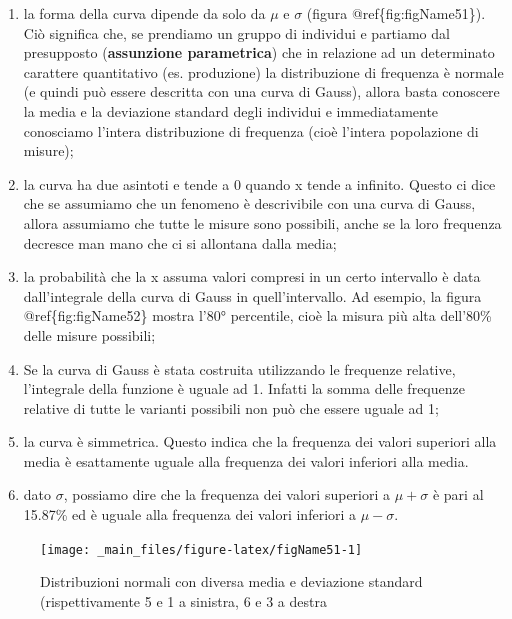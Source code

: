 \documentclass[a4paper,12pt,oneside]{book}
\providecommand{\tightlist}{%
  \setlength{\itemsep}{0pt}\setlength{\parskip}{0pt}}
\begin{document}
\begin{enumerate}
\def\labelenumi{\arabic{enumi}.}
\tightlist
\item
  la forma della curva dipende da solo da \(\mu\) e \(\sigma\) (figura @ref\{fig:figName51\}). Ciò significa che, se prendiamo un gruppo di individui e partiamo dal presupposto (\textbf{assunzione parametrica}) che in relazione ad un determinato carattere quantitativo (es. produzione) la distribuzione di frequenza è normale (e quindi può essere descritta con una curva di Gauss), allora basta conoscere la media e la deviazione standard degli individui e immediatamente conosciamo l'intera distribuzione di frequenza (cioè l'intera popolazione di misure);
\item
  la curva ha due asintoti e tende a 0 quando x tende a infinito. Questo ci dice che se assumiamo che un fenomeno è descrivibile con una curva di Gauss, allora assumiamo che tutte le misure sono possibili, anche se la loro frequenza decresce man mano che ci si allontana dalla media;
\item
  la probabilità che la x assuma valori compresi in un certo intervallo è data dall'integrale della curva di Gauss in quell'intervallo. Ad esempio, la figura @ref\{fig:figName52\} mostra l'80° percentile, cioè la misura più alta dell'80\% delle misure possibili;
\item
  Se la curva di Gauss è stata costruita utilizzando le frequenze relative, l'integrale della funzione è uguale ad 1. Infatti la somma delle frequenze relative di tutte le varianti possibili non può che essere uguale ad 1;
\item
  la curva è simmetrica. Questo indica che la frequenza dei valori superiori alla media è esattamente uguale alla frequenza dei valori inferiori alla media.
\item
  dato \(\sigma\), possiamo dire che la frequenza dei valori superiori a \(\mu + \sigma\) è pari al 15.87\% ed è uguale alla frequenza dei valori inferiori a \(\mu - \sigma\).
\end{enumerate}

\begin{figure}

{\centering \texttt{[image: \_main\_files/figure-latex/figName51-1]} 

}

\caption{Distribuzioni normali con diversa media e deviazione standard (rispettivamente 5 e 1 a sinistra, 6 e 3 a destra}\label{fig:figName51}
\end{figure}
\end{document}
